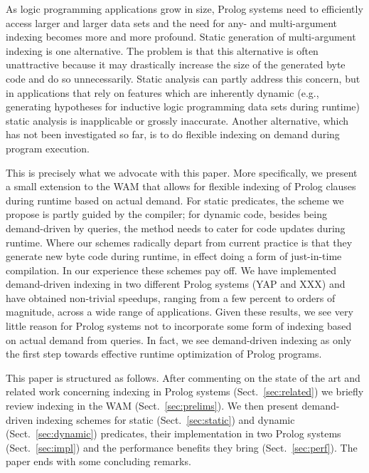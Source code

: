 \documentclass{llncs}
\newcommand{\JITI}{demand-driven indexing\xspace}
\begin{document}
As logic programming applications grow in size, Prolog systems need to
efficiently access larger and larger data sets and the need for any-
and multi-argument indexing becomes more and more profound. Static
generation of multi-argument indexing is one alternative. The problem
is that this alternative is often unattractive because it may
drastically increase the size of the generated byte code and do so
unnecessarily. Static analysis can partly address this concern, but in
applications that rely on features which are inherently dynamic (e.g.,
generating hypotheses for inductive logic programming data sets during
runtime) static analysis is inapplicable or grossly inaccurate.
Another alternative, which has not been investigated so far, is to do
flexible indexing on demand during program execution.

This is precisely what we advocate with this paper. More specifically,
we present a small extension to the WAM that allows for flexible
indexing of Prolog clauses during runtime based on actual demand. For
static predicates, the scheme we propose is partly guided by the
compiler; for dynamic code, besides being demand-driven by queries,
the method needs to cater for code updates during runtime. Where our
schemes radically depart from current practice is that they generate
new byte code during runtime, in effect doing a form of just-in-time
compilation. In our experience these schemes pay off. We have
implemented \JITI in two different Prolog systems (YAP and XXX) and
have obtained non-trivial speedups, ranging from a few percent to
orders of magnitude, across a wide range of applications. Given these
results, we see very little reason for Prolog systems not to
incorporate some form of indexing based on actual demand from queries.
In fact, we see \JITI as only the first step towards effective runtime
optimization of Prolog programs.

This paper is structured as follows. After commenting on the state of
the art and related work concerning indexing in Prolog systems
(Sect.~\ref{sec:related}) we briefly review indexing in the WAM
(Sect.~\ref{sec:prelims}). We then present \JITI schemes for static
(Sect.~\ref{sec:static}) and dynamic (Sect.~\ref{sec:dynamic})
predicates, their implementation in two Prolog systems
(Sect.~\ref{sec:impl}) and the performance benefits they bring
(Sect.~\ref{sec:perf}). The paper ends with some concluding remarks.
\end{document}
